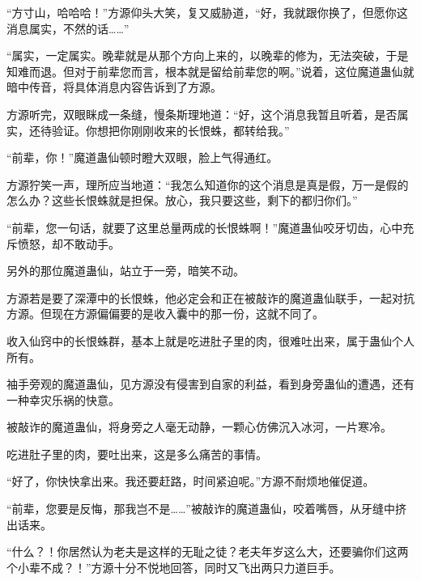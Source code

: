 \begin{this_body}
“方寸山，哈哈哈！”方源仰头大笑，复又威胁道，“好，我就跟你换了，但愿你这消息属实，不然的话……”

“属实，一定属实。晚辈就是从那个方向上来的，以晚辈的修为，无法突破，于是知难而退。但对于前辈您而言，根本就是留给前辈您的啊。”说着，这位魔道蛊仙就暗中传音，将具体消息内容告诉到了方源。

方源听完，双眼眯成一条缝，慢条斯理地道：“好，这个消息我暂且听着，是否属实，还待验证。你想把你刚刚收来的长恨蛛，都转给我。”

“前辈，你！”魔道蛊仙顿时瞪大双眼，脸上气得通红。

方源狞笑一声，理所应当地道：“我怎么知道你的这个消息是真是假，万一是假的怎么办？这些长恨蛛就是担保。放心，我只要这些，剩下的都归你们。”

“前辈，您一句话，就要了这里总量两成的长恨蛛啊！”魔道蛊仙咬牙切齿，心中充斥愤怒，却不敢动手。

另外的那位魔道蛊仙，站立于一旁，暗笑不动。

方源若是要了深潭中的长恨蛛，他必定会和正在被敲诈的魔道蛊仙联手，一起对抗方源。但现在方源偏偏要的是收入囊中的那一份，这就不同了。

收入仙窍中的长恨蛛群，基本上就是吃进肚子里的肉，很难吐出来，属于蛊仙个人所有。

袖手旁观的魔道蛊仙，见方源没有侵害到自家的利益，看到身旁蛊仙的遭遇，还有一种幸灾乐祸的快意。

被敲诈的魔道蛊仙，将身旁之人毫无动静，一颗心仿佛沉入冰河，一片寒冷。

吃进肚子里的肉，要吐出来，这是多么痛苦的事情。

“好了，你快快拿出来。我还要赶路，时间紧迫呢。”方源不耐烦地催促道。

“前辈，您要是反悔，那我岂不是……”被敲诈的魔道蛊仙，咬着嘴唇，从牙缝中挤出话来。

“什么？！你居然认为老夫是这样的无耻之徒？老夫年岁这么大，还要骗你们这两个小辈不成？！”方源十分不悦地回答，同时又飞出两只力道巨手。

\end{this_body}

